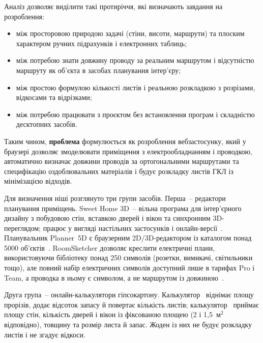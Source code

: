
Аналіз дозволяє виділити такі протиріччя, які визначають завдання на розроблення:
\begin{itemize}[noitemsep, topsep=0.3em, leftmargin=*]
    \item між просторовою природою задачі (стіни, висоти, маршрути) та плоским характером ручних підрахунків і електронних таблиць;
    \item між потребою знати довжину проводу за реальним маршрутом і відсутністю маршруту як об'єкта в засобах планування інтер'єру;
    \item між простою формулою кількості листів і реальною розкладкою з розрізами, відкосами та відрізками;
    \item між потребою працювати з проєктом без встановлення програм і складністю десктопних засобів.
\end{itemize}

Таким чином, \textbf{проблема} формулюється як розроблення вебзастосунку, який у браузері дозволяє змоделювати приміщення з електрообладнанням і проводкою, автоматично визначає довжини проводів за ортогональними маршрутами та специфікацію оздоблювальних матеріалів і будує розкладку листів ГКЛ із мінімізацією відходів.


Для визначення ніші розглянуто три групи засобів. Перша~-- редактори планування приміщень. Sweet Home 3D~-- вільна програма для інтер'єрного дизайну з побудовою стін, вставкою дверей і вікон та синхронним 3D-переглядом; працює у вигляді настільних застосунків і онлайн-версії~. Планувальник Planner~5D є браузерним 2D/3D-редактором із каталогом понад 5000 об'єктів~. RoomSketcher дозволяє креслити електричні плани, використовуючи бібліотеку понад 250 символів (розетки, вимикачі, світильники тощо), але повний набір електричних символів доступний лише в тарифах Pro і Team, а проводка в ньому є символом, а не маршрутом із довжиною~.

Друга група~-- онлайн-калькулятори гіпсокартону. Калькулятор~ віднімає площу прорізів, додає відсоток запасу й повертає кількість листів; калькулятор~ приймає площу стін, кількість дверей і вікон із фіксованою площею (2 і 1,5~м$^2$ відповідно), товщину та розмір листа й запас. Жоден із них не будує розкладку листів і не згадує відкоси.

